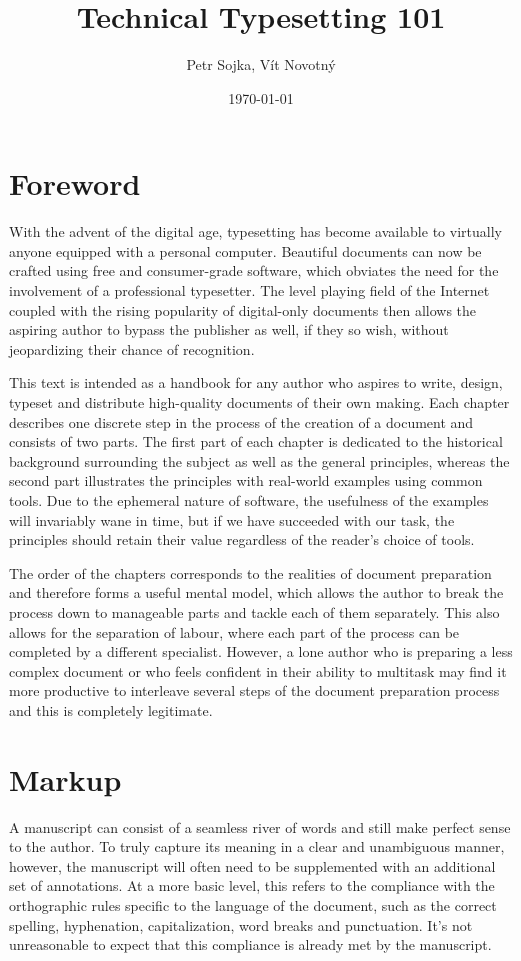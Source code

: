 \documentclass{book}
\title{Technical Typesetting 101}
\author{Petr Sojka, Vít Novotný}
\date{\today}
\begin{document}
  \frontmatter
    \maketitle
    \tableofcontents
  \mainmatter
    \chapter{Foreword}
      With the advent of the digital age, typesetting has become available to
      virtually anyone equipped with a personal computer. Beautiful documents
      can now be crafted using free and consumer-grade software, which obviates
      the need for the involvement of a professional typesetter. The level
      playing field of the Internet coupled with the rising popularity of
      digital-only documents then allows the aspiring author to bypass the
      publisher as well, if they so wish, without jeopardizing their chance of
      recognition.
      
      This text is intended as a handbook for any author who aspires to write,
      design, typeset and distribute high-quality documents of their own making.
      Each chapter describes one discrete step in the process of the creation of
      a document and consists of two parts. The first part of each chapter is
      dedicated to the historical background surrounding the subject as well as
      the general principles, whereas the second part illustrates the principles
      with real-world examples using common tools. Due to the ephemeral nature
      of software, the usefulness of the examples will invariably wane in time,
      but if we have succeeded with our task, the principles should retain their
      value regardless of the reader's choice of tools.

      The order of the chapters corresponds to the realities of document
      preparation and therefore forms a useful mental model, which allows the
      author to break the process down to manageable parts and tackle each of
      them separately. This also allows for the separation of labour, where
      each part of the process can be completed by a different specialist.
      However, a lone author who is preparing a less complex document or who
      feels confident in their ability to multitask may find it more productive
      to interleave several steps of the document preparation process and this
      is completely legitimate.

    \chapter{Markup}
      A manuscript can consist of a seamless river of words and still make
      perfect sense to the author. To truly capture its meaning in a clear and
      unambiguous manner, however, the manuscript will often need to be
      supplemented with an additional set of annotations. At a more basic level,
      this refers to the compliance with the orthographic rules specific to the
      language of the document, such as the correct spelling, hyphenation,
      capitalization, word breaks and punctuation. It's not unreasonable to
      expect that this compliance is already met by the manuscript.
      
\end{document}
